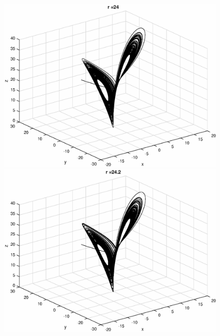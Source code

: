 \begin{figure}[!htb]
\begin{minipage}{0.4\textwidth}
\end{minipage} \\
\begin{minipage}{0.4\textwidth}
\includegraphics[width = \textwidth]{r=24.eps}
\end{minipage}
\begin{minipage}{0.4\textwidth}
\includegraphics[width = \textwidth]{r=24p2.eps}
\end{minipage}\\
\begin{minipage}{0.4\textwidth}

\end{minipage}
\end{figure}
